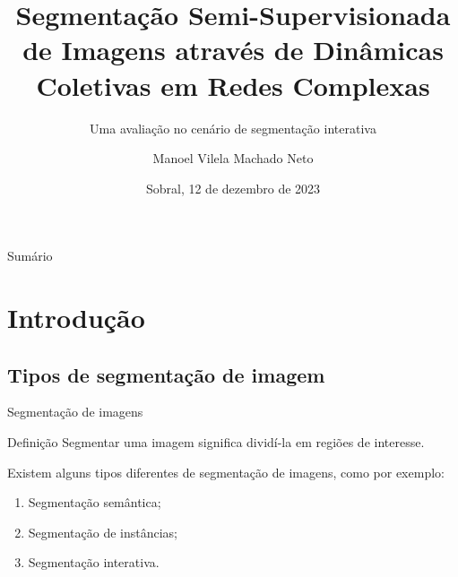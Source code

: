 \documentclass{templatebeamerufc/libs/ufc_format}
\title[EGSIS]{\textbf{Segmentação Semi-Supervisionada de Imagens através de
Dinâmicas Coletivas em Redes Complexas}}
\subtitle{Uma avaliação no cenário de segmentação interativa}
\author{Manoel Vilela Machado Neto}
\institute[UFC]{
    \normalsize{\email{manoel.machado@alu.ufc.br}}
    \newline
    \department{Engenharia da Computação}
    \newline
    \ufc{}
}
\date{Sobral, 12 de dezembro de 2023}
\begin{document}

\begin{frame}{}
    \maketitle
\end{frame}

\begin{frame}[allowframebreaks]{Sumário}
  \tableofcontents[sections={1---2}]  %
    \framebreak{}
  \tableofcontents[sections={3---5}]  %
\end{frame}

\section{Introdução}

\subsection{Tipos de segmentação de imagem}

\begin{frame}{Segmentação de imagens}
  \begin{block}{Definição}
    Segmentar uma imagem significa dividí-la em regiões de interesse.
  \end{block}

  Existem alguns tipos diferentes de segmentação de imagens, como por
exemplo:
  \begin{enumerate}
    \item Segmentação semântica;
    \item Segmentação de instâncias;
    \item Segmentação interativa.
  \end{enumerate}
\end{frame}
\end{document}
